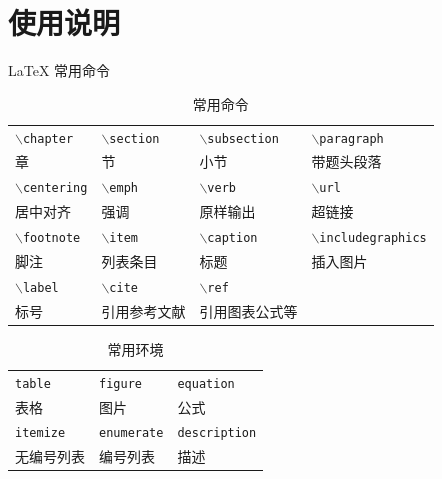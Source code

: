 \documentclass{beamer}
\def\cmd#1{\texttt{\color{red}\footnotesize $\backslash$#1}}
\def\env#1{\texttt{\color{blue}\footnotesize #1}}
\begin{document}
\section{使用说明}



\begin{frame}[fragile]{\LaTeX{} 常用命令}
    \vspace{-1.2em}
    \begin{table}[h]
        \caption{常用命令}
        \centering
        \footnotesize
        \begin{tabular}{llll}
            \toprule
            \cmd{chapter} & \cmd{section} & \cmd{subsection} & \cmd{paragraph} \\
            章 & 节 & 小节 & 带题头段落 \\ \midrule
            \cmd{centering} & \cmd{emph} & \cmd{verb} & \cmd{url} \\
            居中对齐 & 强调 & 原样输出 & 超链接 \\ \midrule
            \cmd{footnote} & \cmd{item} & \cmd{caption} & \cmd{includegraphics} \\
            脚注 & 列表条目 & 标题 & 插入图片 \\ \midrule
            \cmd{label} & \cmd{cite} & \cmd{ref} \\
            标号 & 引用参考文献 & 引用图表公式等 & \\ \bottomrule
        \end{tabular}
    \end{table}
    \begin{table}[h]
        \caption{常用环境}
        \centering
        \footnotesize
        \begin{tabular}{lll}
            \toprule
            \env{table} & \env{figure} & \env{equation}\\
            表格 & 图片 & 公式 \\\midrule
            \env{itemize} & \env{enumerate} & \env{description}\\
            无编号列表 & 编号列表 & 描述 \\\bottomrule
        \end{tabular}
    \end{table}
\end{frame}
\end{document}
